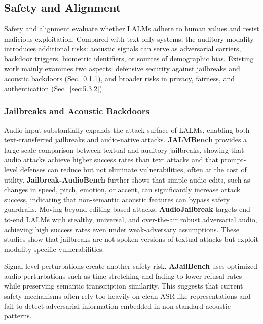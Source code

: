 \subsection{Safety and Alignment}
\label{sec:5.3}

Safety and alignment evaluate whether LALMs adhere to human values and resist malicious exploitation. Compared with text-only systems, the auditory modality introduces additional risks: acoustic signals can serve as adversarial carriers, backdoor triggers, biometric identifiers, or sources of demographic bias. Existing work mainly examines two aspects: defensive security against jailbreaks and acoustic backdoors (Sec.~\ref{sec:5.3.1}), and broader risks in privacy, fairness, and authentication (Sec.~\ref{sec:5.3.2}).

\subsubsection{Jailbreaks and Acoustic Backdoors}
\label{sec:5.3.1}

Audio input substantially expands the attack surface of LALMs, enabling both text-transferred jailbreaks and audio-native attacks. \textbf{JALMBench} \cite{peng2025jalmbench} provides a large-scale comparison between textual and auditory jailbreaks, showing that audio attacks achieve higher success rates than text attacks and that prompt-level defenses can reduce but not eliminate vulnerabilities, often at the cost of utility. \textbf{Jailbreak-AudioBench} \cite{cheng2025jailbreak} further shows that simple audio edits, such as changes in speed, pitch, emotion, or accent, can significantly increase attack success, indicating that non-semantic acoustic features can bypass safety guardrails. Moving beyond editing-based attacks, \textbf{AudioJailbreak} \cite{chen2025audiojailbreak} targets end-to-end LALMs with stealthy, universal, and over-the-air robust adversarial audio, achieving high success rates even under weak-adversary assumptions. These studies show that jailbreaks are not spoken versions of textual attacks but exploit modality-specific vulnerabilities.

Signal-level perturbations create another safety risk. \textbf{AJailBench} \cite{song2025audio} uses optimized audio perturbations such as time stretching and fading to lower refusal rates while preserving semantic transcription similarity. This suggests that current safety mechanisms often rely too heavily on clean ASR-like representations and fail to detect adversarial information embedded in non-standard acoustic patterns.

